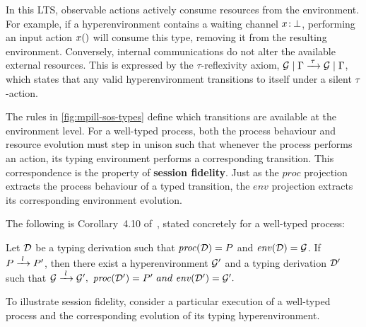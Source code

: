 In this LTS, observable actions actively consume resources from the environment. For example, if a hyperenvironment contains a waiting channel {$x\colon\mspace{-2mu}\bot$}, performing an input action ${{x()}}$ will consume this type, removing it from the resulting environment. Conversely, internal communications do not alter the available external resources. This is expressed by the $\tau$-reflexivity axiom, {$\thl{\hyp{G} \mid \Gamma} \lto{\tau} \thl{\hyp{G} \mid \Gamma}$}, which states that any valid hyperenvironment transitions to itself under a silent $\tau$-action.

The rules in \cref{fig:mpill-sos-types} define which transitions are available at the environment level. For a well-typed process, both the process behaviour and resource evolution must step in unison such that whenever the process performs an action, its typing environment performs a corresponding transition. This correspondence is the property of \textbf{session fidelity}. Just as the $\mathit{proc}$ projection extracts the process behaviour of a typed transition, the $\mathit{env}$ projection extracts its corresponding environment evolution.

The following is Corollary~4.10 of~\citet{abs-2106-11818}, stated concretely for a well-typed process:

\begin{corollary}\label{thm}
Let $\mathcal{D}$ be a typing derivation such that $\mathit{proc}(\mathcal{D}) = P$ and $\mathit{env}(\mathcal{D}) = \mathcal{G}$. If {$\phl{P} \lto{l} \phl{P'}$}, then there exist a hyperenvironment {$\mathcal{G}'$} and a typing derivation $\mathcal{D}'$ such that $\thl{\hyp{G}} \lto{l} \thl{\hyp{G}'},~\mathit{proc}(\der{D}') = \phl{P'} ~and~ \mathit{env}(\der{D}') = \thl{\hyp{G}'}.$
\end{corollary}

To illustrate session fidelity, consider a particular execution of a well-typed process and the corresponding evolution of its typing hyperenvironment.

